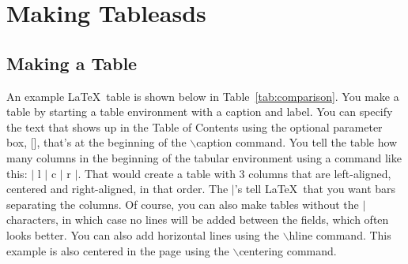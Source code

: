 \chapter{Making Tableasds}
\label{chp:chapter3}
\graphicspath{{figures/}{figures/chapter3/}}


\section{Making a Table}
An example \LaTeX\ table is shown below in Table~\ref{tab:comparison}.
You make a table by starting a table environment with a caption
and label.  You can specify the text that shows up in the Table of
Contents using the optional parameter box, [], that's at the
beginning of the $\backslash$caption command. You tell the table how
many columns in the beginning of the tabular environment using a
command like this: $|$ l $|$ c $|$ r $|$. That would create a table with 3 columns
that are left-aligned, centered and right-aligned, in that order. The $|$'s tell \LaTeX\ that
you want bars separating the columns. Of course, you can also make tables without the $|$ characters, in which case no lines will be added between the fields, which often looks better. You can also add horizontal
lines using the $\backslash$hline command. This example is also centered in the page using the
$\backslash$centering command.
%
\begin{table}[b]
\centering
{}
\ifdim\wd\tempbox<\TPTminimum\relax \tempwidth=\TPTminimum\relax
\else\tempwidth=\wd\tempbox
\fi
\begin{minipage}{\tempwidth}\centering
\caption[Example table]{Description of the table, where the caption is long enough to go onto more than one line. The table caption should not extend beyond the edges of the table, and should make an ``inverted pyramid.''}
\label{tab:comparison}
\usebox{\tempbox}
\end{minipage}
\end{table}
%

